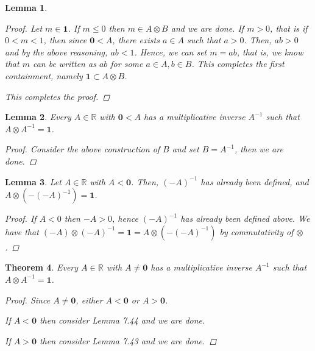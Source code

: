 \documentclass[11pt]{article}
\newcommand{\bbR}{\mathbb{R}}
\newtheorem{theorem}{Theorem}[section]
\newtheorem{lemma}[theorem]{Lemma}
\theoremstyle{definition}
\numberwithin{equation}{subsection}
\begin{document}
\begin{lemma}
\begin{enumerate}[(a)]
\begin{proof}
Let $m \in \mathbf{1}$. If $m\leq 0$ then $m \in A\otimes B$ and we are done. If $m>0$, that is if $0<m<1$, then since $\mathbf{0}<A$, there exists $a\in A$ such that $a>0$. Then, $ab>0$ and by the above reasoning, $ab<1$. Hence, we can set $m=ab$, that is, we know that $m$ can be written as $ab$ for some $a\in A, b\in B$. This completes the first containment, namely $\mathbf{1} \subset A \otimes B$.

This completes the proof.


\renewcommand\qedsymbol{QED}
\end{proof}

    \end{enumerate}
\end{lemma}

\begin{lemma}
	Every $A \in \bbR$ with $\mathbf{0} < A$ has a multiplicative inverse $A^{-1}$ such that $A \otimes A^{-1} = \mathbf{1}$.
        
\begin{proof}
Consider the above construction of $B$ and set $B=A^{-1}$, then we are done.

\renewcommand\qedsymbol{QED}
\end{proof}

\end{lemma}

\begin{lemma}
	Let $A \in \bbR$ with $A < \mathbf{0}$. Then, $(-A)^{-1}$ has already been defined, and $A \otimes (-(-A)^{-1}) = \mathbf{1}$.
        
\begin{proof}
If $A<0$ then $-A>0$, hence $(-A)^{-1}$ has already been defined above. We have that $(-A)\otimes (-A)^{-1}=\mathbf{1}=A\otimes (-(-A)^{-1})$ by commutativity of $\otimes$.


\renewcommand\qedsymbol{QED}
\end{proof}

\end{lemma}

\begin{theorem}
	Every $A \in \bbR$ with $A \neq \mathbf{0}$ has a multiplicative inverse $A^{-1}$ such that $A \otimes A^{-1} = \mathbf{1}$. 
        
\begin{proof}
Since $A\neq \mathbf{0}$, either $A<\mathbf{0}$ or $A>\mathbf{0}$. 

If $A<\mathbf{0}$ then consider Lemma 7.44 and we are done.

If $A > \mathbf{0}$ then consider Lemma 7.43 and we are done.

\renewcommand\qedsymbol{QED}
\end{proof}

\end{theorem}
\end{document}
